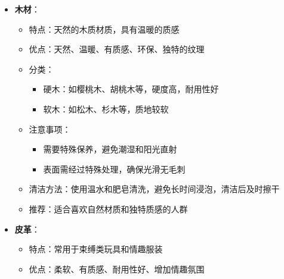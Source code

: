 \documentclass[12pt,UTF8]{ctexbook}
\begin{document}
\begin{itemize}
\begin{itemize}
		\item 优点：坚固、光滑、易于清洁、可加热或冷却使用、无孔隙、使用寿命长
		\item 分类：
		\begin{itemize}
			\item 不锈钢：最常见的金属材质，耐腐蚀，易清洁
			\item 铝：较轻的金属材质，导热性好
			\item 钛：高端材质，重量轻，强度高，抗过敏
		\end{itemize}
		\item 注意事项：
		\begin{itemize}
			\item 较重，使用时需适应
			\item 导热性好，加热或冷却时需避免温度过高或过低
		\end{itemize}
		\item 清洁方法：使用温水和肥皂清洗，可高温消毒
		\item 推荐：适合喜欢重量感和温度变化的人群，以及追求高端品质的人群
	\end{itemize}
	\item \textbf{木材}：
	\begin{itemize}
		\item 特点：天然的木质材质，具有温暖的质感
		\item 优点：天然、温暖、有质感、环保、独特的纹理
		\item 分类：
		\begin{itemize}
			\item 硬木：如樱桃木、胡桃木等，硬度高，耐用性好
			\item 软木：如松木、杉木等，质地较软
		\end{itemize}
		\item 注意事项：
		\begin{itemize}
			\item 需要特殊保养，避免潮湿和阳光直射
			\item 表面需经过特殊处理，确保光滑无毛刺
		\end{itemize}
		\item 清洁方法：使用温水和肥皂清洗，避免长时间浸泡，清洁后及时擦干
		\item 推荐：适合喜欢自然材质和独特质感的人群
	\end{itemize}
	\item \textbf{皮革}：
	\begin{itemize}
		\item 特点：常用于束缚类玩具和情趣服装
		\item 优点：柔软、有质感、耐用性好、增加情趣氛围

\end{itemize}
\end{itemize}
\end{document}
